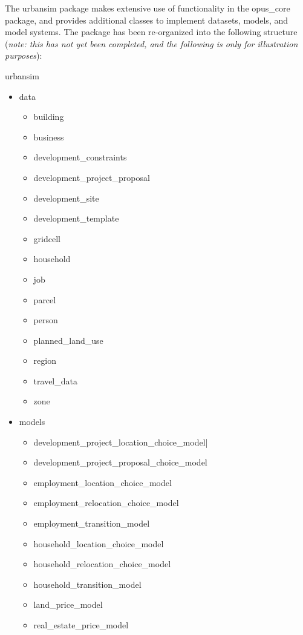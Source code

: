 The urbansim package makes extensive use of functionality in the opus_core package, and provides additional
classes to implement datasets, models, and model systems.  The package has been re-organized into the 
following structure (\emph{note: this has not yet been completed, and the following is only for illustration purposes}):

urbansim
\begin{itemize}
	\item{data}
		\begin{itemize}
			\item{building}
			\item{business}
			\item{development_constraints}
			\item{development_project_proposal}
			\item{development_site}
			\item{development_template}
			\item{gridcell}
			\item{household}
			\item{job}
			\item{parcel}
			\item{person}
			\item{planned_land_use}
			\item{region}
			\item{travel_data}
			\item{zone}
		\end{itemize}
	\item{models}
		\begin{itemize}
			\item{development_project_location_choice_model|}
			\item{development_project_proposal_choice_model}
			\item{employment_location_choice_model}
			\item{employment_relocation_choice_model}
			\item{employment_transition_model}
			\item{household_location_choice_model}
			\item{household_relocation_choice_model}
			\item{household_transition_model}
			\item{land_price_model}
			\item{real_estate_price_model}
		\end{itemize}
\end{itemize}


